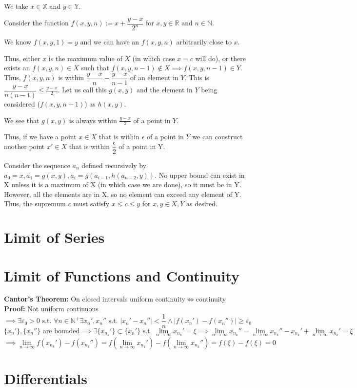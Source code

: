 \documentclass{article}
\newcommand{\N}{\mathbb{N}}
\newcommand{\st}{\mbox{ s.t. }}
\newcommand{\0}{{\bf{0}}}
\begin{document}
We take $x \in \mathbb{X}$ and $y \in \mathbb{Y}.$

Consider the function $f(x,y,n) := x + \dfrac{y-x}{2^n}$ for $x,y \in \mathbb{R}$ and $n \in \mathbb{N}.$

We know $f(x,y,1) = y$ and we can have an $f(x,y,n)$ arbitrarily close to $x.$

Thus, either $x$ is the maximum value of $X$ (in which case $x=c$ will do),
or there exists an $f(x,y,n) \in X$ such that $f(x,y,n-1) \notin X \implies f(x,y,n-1) \in Y$. Thus, $f(x,y,n)$ is within $\dfrac{y-x}{n} - \dfrac{y-x}{n-1}$ of an element in $Y.$ This is $\dfrac{y-x}{n(n-1)} \leq \frac{y-x}{2}.$ Let us call this $g(x,y)$ and the element in $Y$ being considered ($f(x,y,n-1)$) as $h(x,y).$

We see that $g(x,y)$ is always within $\frac{y-x}{2}$ of a point in $Y.$

Thus, if we have a point $x \in X$ that is within $\epsilon$ of a point in $Y$ we can construct another point $x' \in X$ that is within $\dfrac{\epsilon}{2}$ of a point in Y. 

Consider the sequence $a_n$ defined recursively by $a_0 = x, a_1 = g(x,y), a_i = g(a_{i-1}, h(a_{n-2},y)).$
No upper bound can exist in X unless it is a maximum of X (in which case we are done), so it must be in Y. However, all the elements are in X, so no element can exceed any element of Y. Thus, the supremum $c$ must satisfy $x \leq c \leq y$ for $x,y \in X, Y$ as desired.
\section{Limit of Series}
\section{Limit of Functions and Continuity}
\textbf{Cantor's Theorem:} On closed intervals uniform continuity$\iff$continuity\\
\textbf{Proof:}
Not uniform continuous$\implies\exists\varepsilon_0>0\st\forall n\in\N^+\exists x_n',x_n''\st|x_n'-x_n''|<\dfrac{1}{n}\land|f(x_n')-f(x_n'')|\geq\varepsilon_0$
$$\{x_n'\},\{x_n''\}\mbox{ are bounded}\implies\exists\{x_{n_k}'\}\subset\{x_n'\}\st\lim_{n\to\infty}x_{n_k}'=\xi\implies\lim_{n\to\infty}x_{n_k}''=\lim_{n\to\infty}x_{n_k}''-x_{n_k}'+\lim_{n\to\infty}x_{n_k}'=\xi$$
$$\implies\lim_{n\to\infty}f(x_{n_k}')-f(x_{n_k}'')=f\left(\lim_{n\to\infty}x_{n_k}'\right)-f\left(\lim_{n\to\infty}x_{n_k}''\right)=f(\xi)-f(\xi)=0$$
\section{Differentials}
\end{document}

